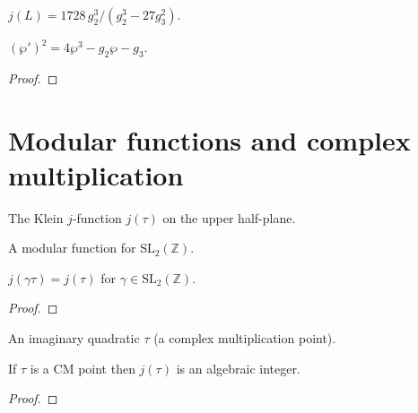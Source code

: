 \begin{definition}
  \label{def:j_invariant_lattice}
  \leanok
  $j(L) = 1728\, g_2^3 / (g_2^3 - 27 g_3^2)$.
\end{definition}

\begin{theorem}
  \label{thm:weierstrass_ode}
  \leanok
  $(\wp')^2 = 4\wp^3 - g_2 \wp - g_3$.
\end{theorem}
\begin{proof}
\end{proof}

\section{Modular functions and complex multiplication}

\begin{definition}
  \label{def:j_function}
  \leanok
  The Klein $j$-function $j(\tau)$ on the upper half-plane.
\end{definition}

\begin{definition}
  \label{def:modular_function}
  \leanok
  A modular function for $\mathrm{SL}_2(\mathbb Z)$.
\end{definition}

\begin{theorem}[$j$ is modular]
  \label{thm:j_modular}
  \leanok
  $j(\gamma\tau) = j(\tau)$ for $\gamma \in \mathrm{SL}_2(\mathbb Z)$.
\end{theorem}
\begin{proof}
\end{proof}

\begin{definition}[CM point]
  \label{def:cm_point}
  \leanok
  An imaginary quadratic $\tau$ (a complex multiplication point).
\end{definition}

\begin{theorem}
  \label{thm:cm_integral}
  \leanok
  If $\tau$ is a CM point then $j(\tau)$ is an algebraic integer.
\end{theorem}
\begin{proof}
\end{proof}

